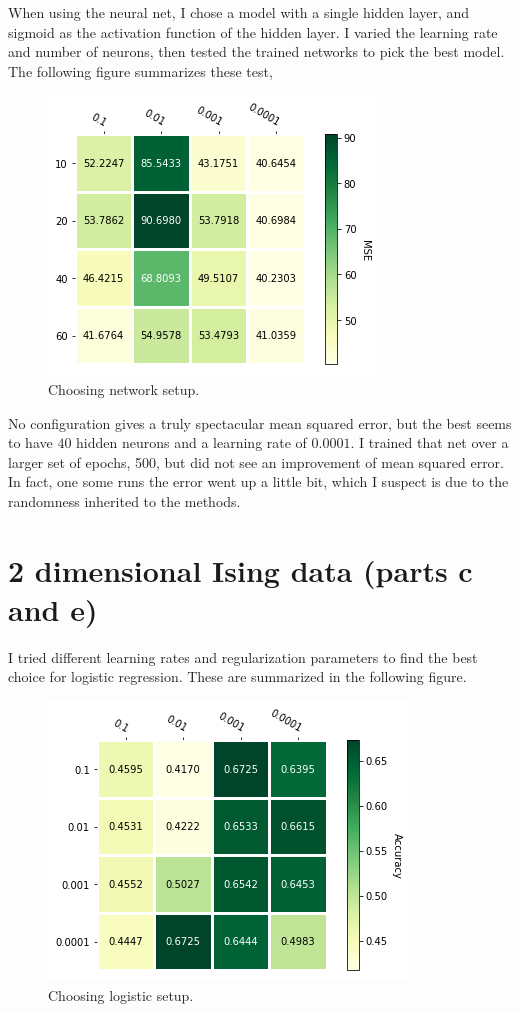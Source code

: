 \documentclass[parskip=half]{scrartcl}
\theoremstyle{definition}
\theoremstyle{remark}
\begin{document}
When using the neural net, I chose a model with a single hidden layer, and sigmoid as the activation function of the hidden layer. 
I varied the learning rate and number of neurons, then tested the trained networks to pick the best model. 
The following figure summarizes these test,

\begin{figure}[H]
\caption{Choosing network setup.}
\centering
\includegraphics[scale=0.6]{1disingneurons.png}
\end{figure}

No configuration gives a truly spectacular mean squared error, but the best seems to have $40$ hidden neurons and a learning rate of $0.0001$. 
I trained that net over a larger set of epochs, 500, but did not see an improvement of mean squared error. 
In fact, one some runs the error went up a little bit, which I suspect is due to the randomness inherited to the methods.    

\section{2 dimensional Ising data (parts c and e)} \label{sec:2dising}

I tried different learning rates and regularization parameters to find the best choice for logistic regression. 
These are summarized in the following figure.

\begin{figure}[H]
\caption{Choosing logistic setup.}
\centering
\includegraphics[scale=0.6]{2dlogistic.png}
\end{figure}
\end{document}
